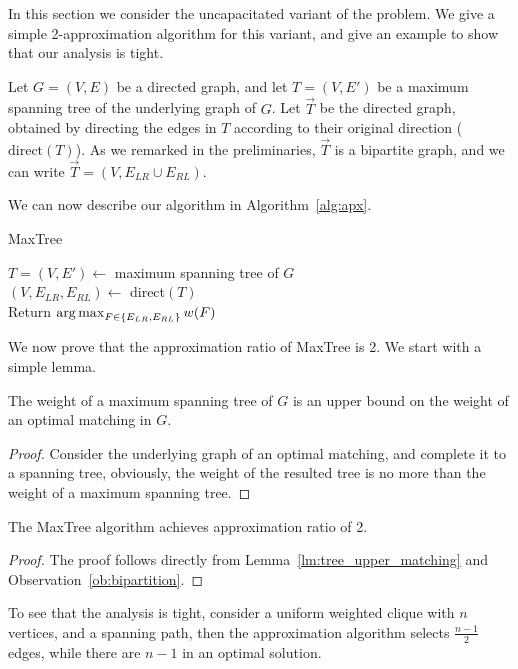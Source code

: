 \label{sub:ucudcm}
In this section we consider the uncapacitated variant of the problem. 
We give a simple 2-approximation algorithm for this variant, 
and give an example to show that our analysis is tight.

Let $G = (V, E)$ be a directed graph, 
and let $T = (V, E')$ be a maximum spanning tree of the underlying graph of $G$.
Let $\overrightarrow{T}$ be the directed graph, 
obtained by directing the edges in $T$ according to their original direction
($\text{direct}(T)$).
As we remarked in the preliminaries, 
$\overrightarrow{T}$ is a bipartite graph, 
and we can write $\overrightarrow{T} = (V, E_{LR} \cup E_{RL})$. 

We can now describe our algorithm in Algorithm~\ref{alg:apx}.

\begin{algorithm}
\label{alg:apx}
\caption{MaxTree}
$T = (V, E') \leftarrow$ maximum spanning tree of $G$	\\
$(V, E_{LR}, E_{RL}) \leftarrow$ direct$(T)$			\\
Return $\operatorname*{arg\,max}_{F \in \{ E_{LR}, E_{RL} \}}{w(F)} $	\\
\end{algorithm}

We now prove that the approximation ratio of MaxTree is 2.
We start with a simple lemma.

\begin{lemma}
\label{lm:tree_upper_matching}
The weight of a maximum spanning tree of $G$ is an upper bound on the weight of
an optimal matching in $G$.
\end{lemma}

\begin{proof}
Consider the underlying graph of an optimal matching, 
and complete it to a spanning tree, obviously, the
weight of the resulted tree is no more than the weight of a maximum spanning
tree.
\end{proof}

\begin{theorem}
The MaxTree algorithm achieves approximation ratio of 2.
\end{theorem}

\begin{proof}
The proof follows directly from 
Lemma~\ref{lm:tree_upper_matching} and Observation~\ref{ob:bipartition}.
\end{proof}

To see that the analysis is tight, 
consider a uniform weighted clique with $n$ vertices, 
and a spanning path, 
then the approximation algorithm selects $\frac{n - 1}{2}$ edges, 
while there are $n - 1$ in an optimal solution.  